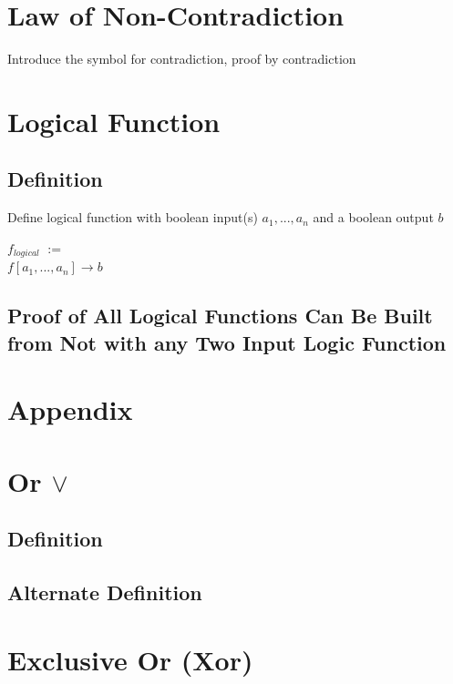 \documentclass[11pt]{article}
\begin{document}
\section{Law of Non-Contradiction}
\begin{center}
Introduce the symbol for contradiction, proof by contradiction
\end{center}




\newpage
\section{Logical Function}
\subsection{Definition}
Define logical function with boolean input(s) $a_1,...,a_n$ and a boolean output $b$
\begin{center}
$f_{logical}$ $:=$\\
$f[a_1,...,a_n] \rightarrow b$
\end{center}
\subsection{Proof of All Logical Functions Can Be Built from Not with any Two Input Logic Function}









\newpage
\section*{Appendix}


\section{Or $\lor$}
\subsection{Definition}
\subsection{Alternate Definition}



\section{Exclusive Or (Xor)}
\end{document}
